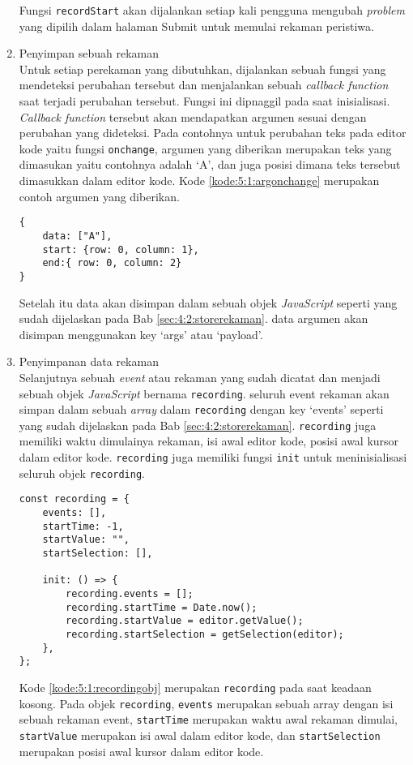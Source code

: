 \begin{enumerate}
    Fungsi \verb|recordStart| akan dijalankan setiap kali pengguna mengubah \textit{problem} yang dipilih dalam halaman Submit untuk memulai rekaman peristiwa.

    \item Penyimpan sebuah rekaman \\
    Untuk setiap perekaman yang dibutuhkan, dijalankan sebuah fungsi yang mendeteksi perubahan tersebut dan menjalankan sebuah \textit{callback function} saat terjadi perubahan tersebut. Fungsi ini dipnaggil pada saat inisialisasi. \textit{Callback function} tersebut akan mendapatkan argumen sesuai dengan perubahan yang dideteksi. Pada contohnya untuk perubahan teks pada editor kode yaitu fungsi \verb|onchange|, argumen yang diberikan merupakan teks yang dimasukan yaitu contohnya adalah `A', dan juga posisi dimana teks tersebut dimasukkan dalam editor kode. Kode \ref{kode:5:1:argonchange} merupakan contoh argumen yang diberikan.
    \begin{lstlisting}[caption={Contoh argumen yang diberikan oleh fungsi onchange}, label={kode:5:1:argonchange}]
{
    data: ["A"], 
    start: {row: 0, column: 1}, 
    end:{ row: 0, column: 2}
}
    \end{lstlisting}
    Setelah itu data akan disimpan dalam sebuah objek \textit{JavaScript}
    seperti yang sudah dijelaskan pada Bab \ref{sec:4:2:storerekaman}. data argumen akan disimpan menggunakan key `args' atau `payload'.
    
    \item Penyimpanan data rekaman \\
    Selanjutnya sebuah \textit{event} atau rekaman yang sudah dicatat dan menjadi sebuah objek \textit{JavaScript} bernama \verb|recording|. seluruh event rekaman akan simpan dalam sebuah \textit{array} dalam \verb|recording| dengan key `events' seperti yang sudah dijelaskan pada Bab \ref{sec:4:2:storerekaman}. \verb|recording| juga memiliki waktu dimulainya rekaman, isi awal editor kode, posisi awal kursor dalam editor kode. \verb|recording| juga memiliki fungsi \verb|init| untuk meninisialisasi seluruh objek \verb|recording|.

    \begin{lstlisting}[caption={Contoh argumen yang diberikan oleh fungsi onchange}, label={kode:5:1:recordingobj}]
const recording = {
    events: [],
    startTime: -1,
    startValue: "",
    startSelection: [],

    init: () => {
        recording.events = [];
        recording.startTime = Date.now();
        recording.startValue = editor.getValue();
        recording.startSelection = getSelection(editor);
    },
};
    \end{lstlisting}

    Kode \ref{kode:5:1:recordingobj} merupakan \verb|recording| pada saat keadaan kosong. Pada objek \verb|recording|, \verb|events| merupakan sebuah array dengan isi sebuah rekaman event, \verb|startTime| merupakan waktu awal rekaman dimulai, \verb|startValue| merupakan isi awal dalam editor kode, dan \verb|startSelection| merupakan posisi awal kursor dalam editor kode.
\end{enumerate}


